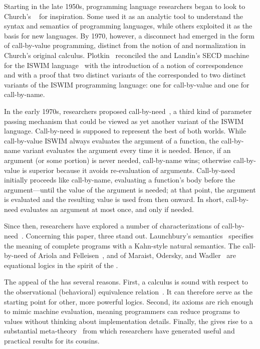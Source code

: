 \documentclass[runningheads,a4paper]{llncs}
\begin{document}
Starting in the late 1950s, programming language researchers began to look
 to Church's \lc~\cite{Church41:CalcOfLambdaConv} for inspiration. Some
 used it as an analytic tool to understand the syntax and semantics of
 programming languages, while others exploited it as the basis for new 
 languages. By 1970, however, a disconnect had emerged in the form of
 call-by-value programming, distinct from the notion of  and
 normalization in Church's original calculus. Plotkin~\cite{Plotkin1975LC}
 reconciled the \lc and Landin's SECD machine for the ISWIM language~\cite{pl:iswim} with
 the introduction of a notion of correspondence and with a proof that two
 distinct variants of the \lc corresponded to two distinct variants of the
 ISWIM programming language: one for call-by-value and one for
 call-by-name.

In the early 1970s, researchers proposed  call-by-need~\cite{Friedman1976Cons,Henderson1976Lazy,Wadsworth1971Thesis},
 a third kind of parameter passing mechanism
 that could be viewed as yet another variant of the ISWIM
 language. Call-by-need is supposed to represent the best of both worlds. While
 call-by-value ISWIM always evaluates the argument of a function, the
 call-by-name variant evaluates the argument every time it is needed. Hence, if
 an argument (or some portion) is never needed, call-by-name wins; otherwise
 call-by-value is superior because it avoids re-evaluation of
 arguments. Call-by-need initially proceeds like call-by-name, evaluating
 a function's body before the argument---until the value of the argument is
 needed; at that point, the argument is evaluated and the resulting value is
 used from then onward. In short, call-by-need evaluates an argument at
 most once, and only if needed.

Since then, researchers have explored a number of characterizations of
 call-by-need~\cite{Danvy2010Cbneed,Friedman2007LazyKrivine,Garcia2009Delimited,Josephs1989Lazy,Nakata2009Cbneed,PeytonJones1989Spineless,Purushothaman1992Lazy}.
 Concerning this paper, three stand out. Launchbury's
 semantics~\cite{Launchbury1993Natural} specifies the meaning of complete
 programs with a Kahn-style natural semantics. The call-by-need \lcs of Ariola
 and Felleisen~\cite{Ariola1994Cbneed,Ariola1997Cbneed,Ariola1995Cbneed}, and
 of Maraist, Odersky, and
 Wadler~\cite{Ariola1995Cbneed,Maraist1994Cbneed,Maraist1998Cbneed} are
 equational logics in the spirit of the \lc.

The appeal of the \lc has several reasons. First, a calculus is sound
 with respect to the observational (behavioral) equivalence
 relation~\cite{Morris1968Thesis}. It can therefore serve as the starting
 point for other, more powerful logics. Second, its axioms are rich
 enough to mimic machine evaluation, meaning programmers can reduce
 programs to values without thinking about implementation details. Finally,
 the \lc gives rise to a substantial
 meta-theory~\cite{Barendregt1985LC,CurryFeys1958Combinatory} from which
 researchers have generated useful and practical results for its cousins.
\end{document}
